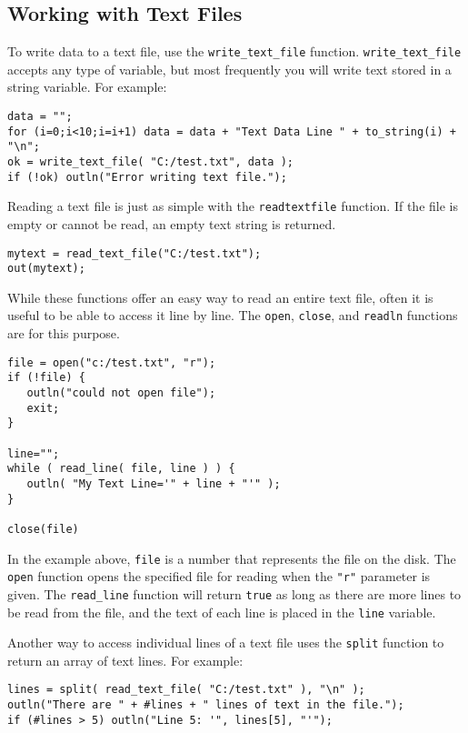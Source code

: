 \documentclass{article}
\begin{document}
\subsection{Working with Text Files}

To write data to a text file, use the \texttt{write\_text\_file} function.  \texttt{write\_text\_file} accepts any type of variable, but most frequently you will write text stored in a string variable.  For example:

\begin{verbatim}
data = "";
for (i=0;i<10;i=i+1) data = data + "Text Data Line " + to_string(i) + "\n";
ok = write_text_file( "C:/test.txt", data );
if (!ok) outln("Error writing text file.");
\end{verbatim}

Reading a text file is just as simple with the \texttt{readtextfile} function.  If the file is empty or cannot be read, an empty text string is returned.

\begin{verbatim}
mytext = read_text_file("C:/test.txt");
out(mytext);
\end{verbatim}

While these functions offer an easy way to read an entire text file, often it is useful to be able to access it line by line.  The \texttt{open}, \texttt{close}, and \texttt{readln} functions are for this purpose. 

\begin{verbatim}
file = open("c:/test.txt", "r");
if (!file) {
   outln("could not open file");
   exit;
}

line="";
while ( read_line( file, line ) ) {
   outln( "My Text Line='" + line + "'" );
}

close(file)
\end{verbatim}

In the example above, \texttt{file} is a number that represents the file on the disk.  The \texttt{open} function opens the specified file for reading when the \texttt{"r"} parameter is given.  The \texttt{read\_line} function will return \texttt{true} as long as there are more lines to be read from the file, and the text of each line is placed in the \texttt{line} variable.

Another way to access individual lines of a text file uses the \texttt{split} function to return an array of text lines.  For example:

\begin{verbatim}
lines = split( read_text_file( "C:/test.txt" ), "\n" );
outln("There are " + #lines + " lines of text in the file.");
if (#lines > 5) outln("Line 5: '", lines[5], "'");
\end{verbatim}
\end{document}
